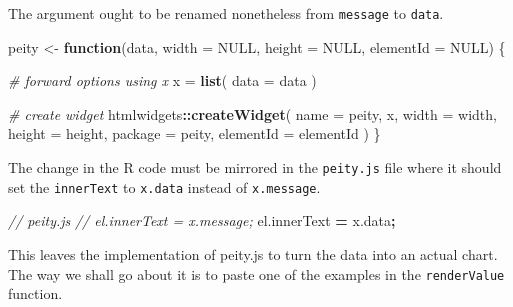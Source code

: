 \documentclass[
]{krantz}
\makeatletter
\newenvironment{Shaded}{\begin{snugshade}}{\end{snugshade}}
\newcommand{\AttributeTok}[1]{\textcolor[rgb]{0.61,0.61,0.61}{#1}}
\newcommand{\CommentTok}[1]{\textcolor[rgb]{0.37,0.37,0.37}{\textit{#1}}}
\newcommand{\ControlFlowTok}[1]{\textcolor[rgb]{0.27,0.27,0.27}{\textbf{#1}}}
\newcommand{\DataTypeTok}[1]{\textcolor[rgb]{0.27,0.27,0.27}{#1}}
\newcommand{\KeywordTok}[1]{\textcolor[rgb]{0.27,0.27,0.27}{\textbf{#1}}}
\newcommand{\NormalTok}[1]{#1}
\newcommand{\OperatorTok}[1]{\textcolor[rgb]{0.43,0.43,0.43}{\textbf{#1}}}
\newcommand{\OtherTok}[1]{\textcolor[rgb]{0.37,0.37,0.37}{#1}}
\newcommand{\StringTok}[1]{\textcolor[rgb]{0.5,0.5,0.5}{#1}}
\newcommand{\VariableTok}[1]{\textcolor[rgb]{0,0,0}{#1}}
\newenvironment{kframe}{%
\medskip{}
\setlength{\fboxsep}{.8em}
 \def\at@end@of@kframe{}%
 \ifinner\ifhmode%
  \def\at@end@of@kframe{\end{minipage}}%
  \begin{minipage}{\columnwidth}%
 \fi\fi%
 \def\FrameCommand##1{\hskip\@totalleftmargin \hskip-\fboxsep
 \colorbox{shadecolor}{##1}\hskip-\fboxsep
     \hskip-\linewidth \hskip-\@totalleftmargin \hskip\columnwidth}%
 \MakeFramed {\advance\hsize-\width
   \@totalleftmargin\z@ \linewidth\hsize
   \@setminipage}}%
 {\par\unskip\endMakeFramed%
 \at@end@of@kframe}
\renewenvironment{Shaded}{\begin{kframe}}{\end{kframe}}
\makeatother
\begin{document}
The argument ought to be renamed nonetheless from \texttt{message} to \texttt{data}.

\begin{Shaded}
\begin{Highlighting}[]
\NormalTok{peity <{-}}\StringTok{ }\ControlFlowTok{function}\NormalTok{(data, }\DataTypeTok{width =} \OtherTok{NULL}\NormalTok{, }\DataTypeTok{height =} \OtherTok{NULL}\NormalTok{, }
  \DataTypeTok{elementId =} \OtherTok{NULL}\NormalTok{) \{}

  \CommentTok{\# forward options using x}
\NormalTok{  x =}\StringTok{ }\KeywordTok{list}\NormalTok{(}
    \DataTypeTok{data =}\NormalTok{ data}
\NormalTok{  )}

  \CommentTok{\# create widget}
\NormalTok{  htmlwidgets}\OperatorTok{::}\KeywordTok{createWidget}\NormalTok{(}
    \DataTypeTok{name =} \StringTok{\textquotesingle{}peity\textquotesingle{}}\NormalTok{,}
\NormalTok{    x,}
    \DataTypeTok{width =}\NormalTok{ width,}
    \DataTypeTok{height =}\NormalTok{ height,}
    \DataTypeTok{package =} \StringTok{\textquotesingle{}peity\textquotesingle{}}\NormalTok{,}
    \DataTypeTok{elementId =}\NormalTok{ elementId}
\NormalTok{  )}
\NormalTok{\}}
\end{Highlighting}
\end{Shaded}

The change in the R code must be mirrored in the \texttt{peity.js} file where it should set the \texttt{innerText} to \texttt{x.data} instead of \texttt{x.message}.

\begin{Shaded}
\begin{Highlighting}[]
\CommentTok{// peity.js}
\CommentTok{// el.innerText = x.message;}
\VariableTok{el}\NormalTok{.}\AttributeTok{innerText} \OperatorTok{=} \VariableTok{x}\NormalTok{.}\AttributeTok{data}\OperatorTok{;}
\end{Highlighting}
\end{Shaded}

This leaves the implementation of peity.js to turn the data into an actual chart. The way we shall go about it is to paste one of the examples in the \texttt{renderValue} function.

\begin{Shaded}
\end{Shaded}
\end{document}
